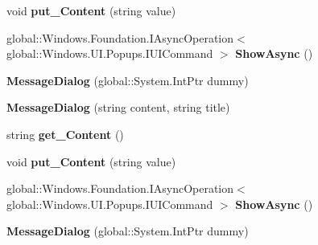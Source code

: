 \begin{DoxyCompactItemize}
void {\bfseries put\+\_\+\+Content} (string value)
\item 
\mbox{\label{class_windows_1_1_u_i_1_1_popups_1_1_message_dialog_a8e63c5ddb4030ceeb6e297828c9c9e8b}} 
global\+::\+Windows.\+Foundation.\+I\+Async\+Operation$<$ global\+::\+Windows.\+U\+I.\+Popups.\+I\+U\+I\+Command $>$ {\bfseries Show\+Async} ()
\item 
\mbox{\label{class_windows_1_1_u_i_1_1_popups_1_1_message_dialog_a3f82d7d935a9d6b254124727d7e3c793}} 
{\bfseries Message\+Dialog} (global\+::\+System.\+Int\+Ptr dummy)
\item 
\mbox{\label{class_windows_1_1_u_i_1_1_popups_1_1_message_dialog_a6e6261d06149819ffae64bd6cf844452}} 
{\bfseries Message\+Dialog} (string content, string title)
\item 
\mbox{\label{class_windows_1_1_u_i_1_1_popups_1_1_message_dialog_a5dfca1b3a2d32d5796ee862e6ce6d463}} 
string {\bfseries get\+\_\+\+Content} ()
\item 
\mbox{\label{class_windows_1_1_u_i_1_1_popups_1_1_message_dialog_acbe1e51198d51c884324ef14c8eb18fd}} 
void {\bfseries put\+\_\+\+Content} (string value)
\item 
\mbox{\label{class_windows_1_1_u_i_1_1_popups_1_1_message_dialog_a8e63c5ddb4030ceeb6e297828c9c9e8b}} 
global\+::\+Windows.\+Foundation.\+I\+Async\+Operation$<$ global\+::\+Windows.\+U\+I.\+Popups.\+I\+U\+I\+Command $>$ {\bfseries Show\+Async} ()
\item 
\mbox{\label{class_windows_1_1_u_i_1_1_popups_1_1_message_dialog_a3f82d7d935a9d6b254124727d7e3c793}} 
{\bfseries Message\+Dialog} (global\+::\+System.\+Int\+Ptr dummy)
\item 
\mbox{\label{class_windows_1_1_u_i_1_1_popups_1_1_message_dialog_a6e6261d06149819ffae64bd6cf844452}} 

\end{DoxyCompactItemize}
